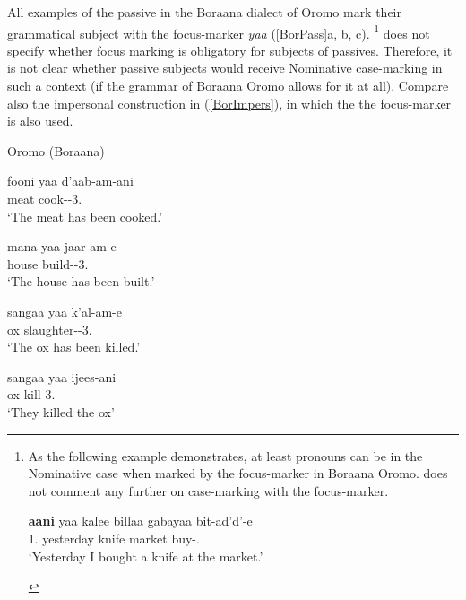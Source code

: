All examples of the passive in the Boraana dialect of Oromo mark their grammatical subject with the focus-marker \emph{yaa} (\ref{BorPass}a, b, c).
\footnote{As the following example demonstrates, at least pronouns can be in the Nominative case when marked by the focus-marker in Boraana Oromo. 
\citet[74]{Stroomer:1995} does not comment any further on case-marking with the focus-marker.

\begin{exe}\ex\gll \textbf{aani} yaa kalee billaa gabayaa bit-ad'd'-e\\
1\sg{}.\nom{} \foc{} yesterday knife market buy-\sg{}.\pst{}\\
`Yesterday I bought a knife at the market.'
\end{exe} } 
\citet{Stroomer:1995} does not specify whether focus marking is obligatory for subjects of passives. 
Therefore, it is not clear whether passive subjects would receive Nominative case-marking in such a context (if the grammar of Boraana Oromo allows for it at all).
Compare also the impersonal construction in (\ref{BorImpers}), in which the the focus-marker is also used. %

\begin{exe} \ex\label{BorPass}  {Oromo (Boraana)} \citep[74, 89, 90]{Stroomer:1995}\nopagebreak[4]
\begin{xlist}\ex\gll fooni yaa d'aab-am-ani\\
meat \foc{} cook-\pass{}-3\pl{}.\pst{}\\
`The meat has been cooked.'

\ex\gll mana yaa jaar-am-e\\
house \foc{} build-\pass{}-3\sg{}.\pst{}\\
`The house has been built.'

\ex\gll sangaa yaa k'al-am-e\\
ox \foc{} slaughter-\pass{}-3\sg{}.\pst{}\\
`The ox has been killed.'

\ex\label{BorImpers}\gll sangaa yaa ijees-ani\\
ox \foc{} kill-3\pl{}.\pst{}\\
`They killed the ox' %

\end{xlist} 
\end{exe}  



